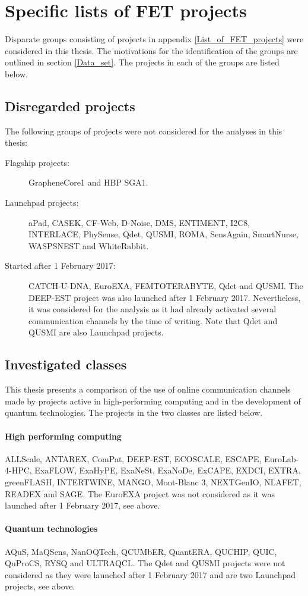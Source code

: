 \chapter{Specific lists of FET projects} \label{Specific_lists_of_FET_projects}
Disparate groups consisting of projects in appendix \ref{List_of_FET_projects} were considered in this thesis. The motivations for the identification of the groups are outlined in section \ref{Data_set}. The projects in each of the groups are listed below.

\section{Disregarded projects}
The following groups of projects were not considered for the analyses in this thesis:

\begin{description}
 \item [Flagship projects:] GrapheneCore1 and HBP SGA1.
 \item [Launchpad projects:] aPad, CASEK, CF-Web, D-Noise, DMS, ENTIMENT, I2C8, INTERLACE, PhySense, Qdet, QUSMI, ROMA, SensAgain, SmartNurse, WASPSNEST and WhiteRabbit.
 \item [Started after 1 February 2017:] CATCH-U-DNA, EuroEXA, FEMTOTERABYTE, Qdet and QUSMI. The DEEP-EST project was also launched after 1 February 2017. Nevertheless, it was considered for the analysis as it had already activated several communication channels by the time of writing. Note that Qdet and QUSMI are also Launchpad projects. 
\end{description}

\section{Investigated classes}
This thesis presents a comparison of the use of online communication channels made by projects active in high-performing computing and in the development of quantum technologies. The projects in the two classes are listed below. 

\subsubsection{High performing computing}
ALLScale, ANTAREX, ComPat, DEEP-EST, ECOSCALE, ESCAPE, EuroLab-4-HPC, ExaFLOW, ExaHyPE, ExaNeSt, ExaNoDe, ExCAPE, EXDCI, EXTRA, greenFLASH, INTERTWINE, MANGO, Mont-Blanc 3, NEXTGenIO, NLAFET, READEX and SAGE. The  EuroEXA project was not considered as it was launched after 1 February 2017, see above.

\subsubsection{Quantum technologies}
AQuS, MaQSens, NanOQTech, QCUMbER, QuantERA, QUCHIP, QUIC, QuProCS, RYSQ and ULTRAQCL. The Qdet and QUSMI projects were not considered as they were launched after 1 February 2017 and are two Launchpad projects, see above.
